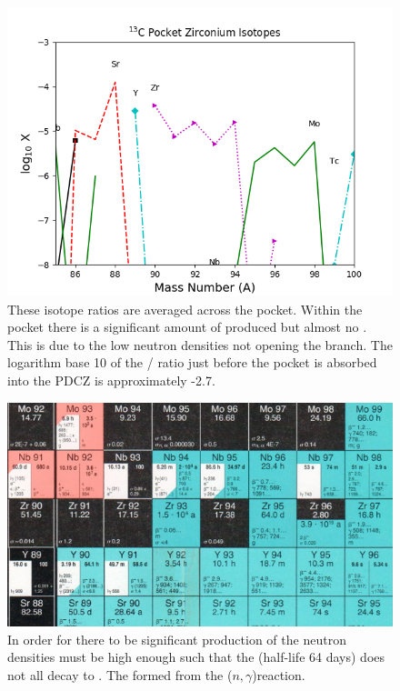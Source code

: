 \documentclass[fleqn,usenatbib]{mnras}
\begin{document}
\begin{figure}
  \includegraphics[width=\columnwidth]{figs/C13_Zr.png}
  \caption{These isotope ratios are averaged across the \carbon[13] pocket. Within the \carbon[13] pocket there is a significant amount of \zirconium[94] produced but almost no \zirconium[96]. This is due to the low neutron densities not opening the \zirconium[95] branch. The logarithm base 10 of the \zirconium[96] / \zirconium[94] ratio just before the \carbon[13] pocket is absorbed into the PDCZ is approximately -2.7.} 
\end{figure}

\begin{figure}
	\includegraphics[width=\columnwidth]{figs/Zr95_branch.png}
    \caption{In order for there to be significant production of \zirconium[96] the neutron densities must be high enough such that the \zirconium[95] (half-life 64 days) does not all decay to \niobium[95]. The \zirconium[95] formed from the \zirconium[94]($n,\gamma$)\zirconium[95] reaction.}
\end{figure}
\end{document}
